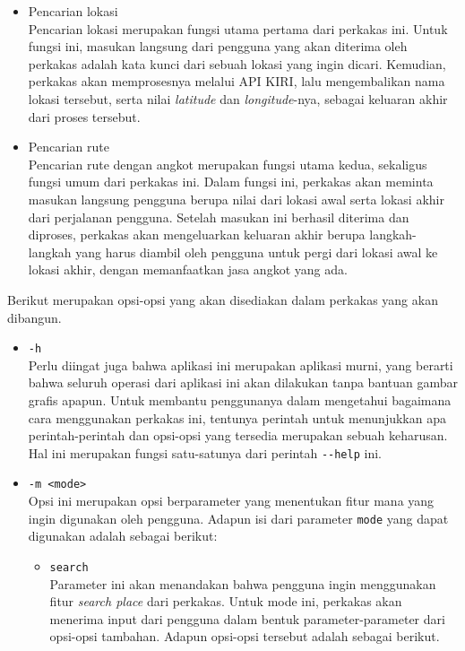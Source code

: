 \documentclass[a4paper,twoside]{article}
\begin{document}
\begin{enumerate}
\begin{itemize}
	\item Pencarian lokasi\\
	Pencarian lokasi merupakan fungsi utama pertama dari perkakas ini. Untuk fungsi ini, masukan langsung dari pengguna yang akan diterima oleh perkakas adalah kata kunci dari sebuah lokasi yang ingin dicari. Kemudian, perkakas akan memprosesnya melalui API KIRI, lalu mengembalikan nama lokasi tersebut, serta nilai \textit{latitude} dan \textit{longitude}-nya, sebagai keluaran akhir dari proses tersebut.
	\item Pencarian rute\\
	Pencarian rute dengan angkot merupakan fungsi utama kedua, sekaligus fungsi umum dari perkakas ini. Dalam fungsi ini, perkakas akan meminta masukan langsung pengguna berupa nilai \latlon dari lokasi awal serta lokasi akhir dari perjalanan pengguna. Setelah masukan ini berhasil diterima dan diproses, perkakas akan mengeluarkan keluaran akhir berupa langkah-langkah yang harus diambil oleh pengguna untuk pergi dari lokasi awal ke lokasi akhir, dengan memanfaatkan jasa angkot yang ada.
\end{itemize}
\vspace{\baselineskip}\noindent
Berikut merupakan opsi-opsi yang akan disediakan dalam perkakas yang akan dibangun.

\begin{itemize}
	\item \verb|-h|\\
	Perlu diingat juga bahwa aplikasi ini merupakan aplikasi \cl murni, yang berarti bahwa seluruh operasi dari aplikasi ini akan dilakukan tanpa bantuan gambar grafis apapun. Untuk membantu penggunanya dalam mengetahui bagaimana cara menggunakan perkakas ini, tentunya perintah untuk menunjukkan apa perintah-perintah dan opsi-opsi yang tersedia merupakan sebuah keharusan. Hal ini merupakan fungsi satu-satunya dari perintah \verb|--help| ini.
	
	\item \verb|-m <mode>|\\
	Opsi ini merupakan opsi berparameter yang menentukan fitur mana yang ingin digunakan oleh pengguna. Adapun isi dari parameter \verb|mode| yang dapat digunakan adalah sebagai berikut:
	
	\begin{itemize}	
		\item \verb|search|\\
		Parameter ini akan menandakan bahwa pengguna ingin menggunakan fitur \textit{search place} dari perkakas. Untuk mode ini, perkakas akan menerima input dari pengguna dalam bentuk parameter-parameter dari opsi-opsi tambahan. Adapun opsi-opsi tersebut adalah sebagai berikut.
			

\end{itemize}
\end{itemize}
\end{enumerate}
\end{document}
